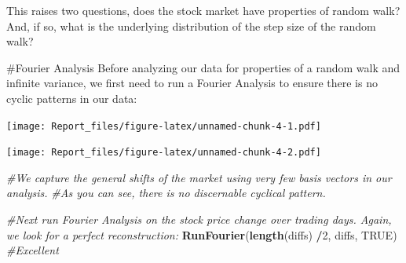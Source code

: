 \documentclass[]{article}
\newenvironment{Shaded}{\begin{snugshade}}{\end{snugshade}}
\newcommand{\CommentTok}[1]{\textcolor[rgb]{0.56,0.35,0.01}{\textit{#1}}}
\newcommand{\DecValTok}[1]{\textcolor[rgb]{0.00,0.00,0.81}{#1}}
\newcommand{\KeywordTok}[1]{\textcolor[rgb]{0.13,0.29,0.53}{\textbf{#1}}}
\newcommand{\NormalTok}[1]{#1}
\newcommand{\OperatorTok}[1]{\textcolor[rgb]{0.81,0.36,0.00}{\textbf{#1}}}
\newcommand{\OtherTok}[1]{\textcolor[rgb]{0.56,0.35,0.01}{#1}}
\begin{document}
This raises two questions, does the stock market have properties of
random walk? And, if so, what is the underlying distribution of the step
size of the random walk?

\#Fourier Analysis Before analyzing our data for properties of a random
walk and infinite variance, we first need to run a Fourier Analysis to
ensure there is no cyclic patterns in our data:

\begin{Shaded}
\end{Shaded}

\texttt{[image: Report\_files/figure-latex/unnamed-chunk-4-1.pdf]}

\begin{Shaded}
\end{Shaded}

\texttt{[image: Report\_files/figure-latex/unnamed-chunk-4-2.pdf]}

\begin{Shaded}
\begin{Highlighting}[]
\CommentTok{#We capture the general shifts of the market using very few basis vectors in our analysis.}
\CommentTok{#As you can see, there is no discernable cyclical pattern.}

\CommentTok{#Next run Fourier Analysis on the stock price change over trading days. Again, we look for a perfect reconstruction:}
\KeywordTok{RunFourier}\NormalTok{(}\KeywordTok{length}\NormalTok{(diffs) }\OperatorTok{/}\DecValTok{2}\NormalTok{, diffs, }\OtherTok{TRUE}\NormalTok{) }\CommentTok{#Excellent}
\end{Highlighting}
\end{Shaded}
\end{document}

